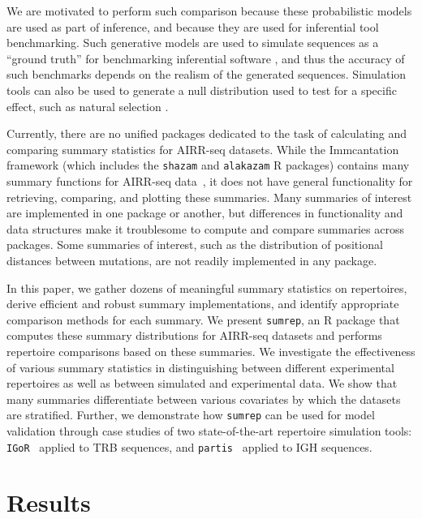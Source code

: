 \documentclass{article}
\newcommand{\partis}{\texttt{partis}}
\newcommand{\igor}{\texttt{IGoR}}
\begin{document}
We are motivated to perform such comparison because these probabilistic models are used as part of inference, and because they are used for inferential tool benchmarking.
Such generative models are used to simulate sequences as a ``ground truth'' for benchmarking inferential software \cite{Ralph2016-iz,Gupta2017-ve,Marcou2018-du}, and thus the accuracy of such benchmarks depends on the realism of the generated sequences.
Simulation tools can also be used to generate a null distribution used to test for a specific effect, such as natural selection \cite{Yaari2012-kk}.

Currently, there are no unified packages dedicated to the task of calculating and comparing summary statistics for AIRR-seq datasets.
While the Immcantation framework (which includes the \texttt{shazam} and \texttt{alakazam} R packages) contains many summary functions for AIRR-seq data~\cite{Gupta2015-iu}, it does not have general functionality for retrieving, comparing, and plotting these summaries.
Many summaries of interest are implemented in one package or another, but differences in functionality and data structures make it troublesome to compute and compare summaries across packages.
Some summaries of interest, such as the distribution of positional distances between mutations, are not readily implemented in any package.

In this paper, we gather dozens of meaningful summary statistics on repertoires, derive efficient and robust summary implementations, and identify appropriate comparison methods for each summary.
We present \texttt{sumrep}, an R package that computes these summary distributions for AIRR-seq datasets and performs repertoire comparisons based on these summaries.
We investigate the effectiveness of various summary statistics in distinguishing between different experimental repertoires as well as between simulated and experimental data.
We show that many summaries differentiate between various covariates by which the datasets are stratified.
Further, we demonstrate how \texttt{sumrep} can be used for model validation through case studies of two state-of-the-art repertoire simulation tools: \igor~\cite{Marcou2018-du} applied to TRB sequences, and \partis~\cite{Ralph2016-nw, Ralph2016-iz} applied to IGH sequences.


\section*{Results}
\end{document}
